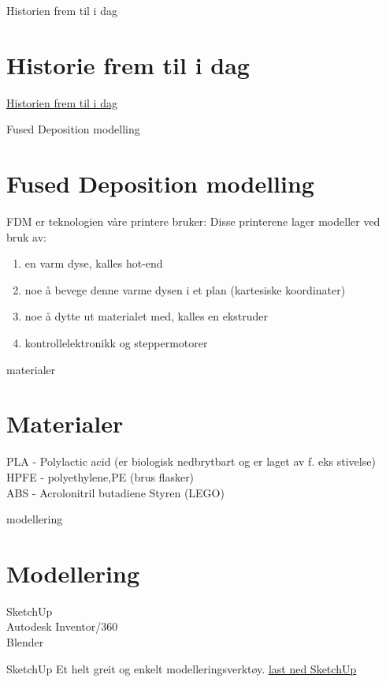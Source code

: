 \documentclass[12pt]{beamer}
\begin{document}
\begin{frame}{Historien frem til i dag}
\section{Historie frem til i dag}
\href{http://www.engineering.com/3DPrinting/3DPrintingArticles/ArticleID/6262/Infographic-The-History-of-3D-Printing.aspx}{Historien frem til i dag}
\end{frame}

\begin{frame}{Fused Deposition modelling}
\section{Fused Deposition modelling}
FDM er teknologien våre printere bruker:
Disse printerene lager modeller ved bruk av: 
\begin{enumerate}
\item en varm dyse, kalles hot-end
\item noe å bevege denne varme dysen i et plan (kartesiske koordinater)
\item noe å dytte ut materialet med, kalles en ekstruder
\item kontrollelektronikk og steppermotorer
\end{enumerate}
\end{frame}

\begin{frame}{materialer}
\section{Materialer}
PLA - Polylactic acid (er biologisk nedbrytbart og er laget av f. eks stivelse)\\
HPFE - polyethylene,PE (brus flasker)\\
ABS - Acrolonitril  butadiene Styren (LEGO)\\
\end{frame}

\begin{frame}{modellering}
\section{Modellering}
SketchUp \\
Autodesk Inventor/360 \\
Blender \\
\end{frame}

\begin{frame}{SketchUp}
Et helt greit og enkelt modelleringsverktøy.
\href{http://www.sketchup.com/download}{last ned SketchUp}
\end{frame}
\end{document}
